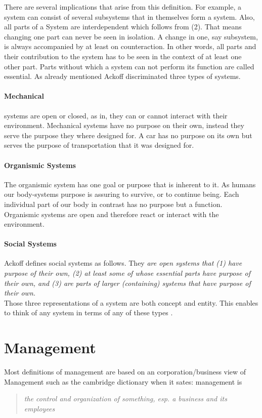 \documentclass{scrartcl}
\begin{document}
There are several implications that arise from this definition. For example, a system can consist of several subsystems that in themselves form a system. Also, all parts of a System are interdependent which follows from (2). That means changing one part can never be seen in isolation. A change in one, say subsystem, is always accompanied by at least on counteraction. In other words, all parts and their contribution to the system has to be seen in the context of at least one other part.
Parts without which a system can not perform its function are called essential.
As already mentioned Ackoff discriminated three types of systems.

\paragraph{Mechanical} systems are open or closed, as in, they can or cannot interact with their environment. Mechanical systems have no purpose on their own, instead they serve the purpose they where designed for. A car has no purpose on its own but serves the purpose of transportation that it was designed for.  


\paragraph{Organismic Systems}
The organismic system has one goal or purpose that is inherent to it. As humans our body-systems purpose is assuring to survive, or to continue being. Each individual part of our body in contrast has no purpose but a function. Organismic systems are open and therefore react or interact with the environment.



\paragraph{Social Systems}
Ackoff defines social systems as follows. They {\itshape{ \glqq are open systems that (1) have purpose of their own, (2) at least some of whose essential parts have purpose of their own, and (3) are parts of larger (containing) systems that have purpose of their own. \grqq}} \cite{ackoff1994systems} 
\\

Those three representations of a system are both concept and entity. This enables to think of any system in terms of any of these types \cite{ackoff1994systems}. 


\section{Management}
Most definitions of management are based on an corporation/business view of Management such as the cambridge dictionary when it sates: management is\\
\begin{quote}\itshape{ \glqq the control and organization of something, esp. a business and its employees \grqq
} \cite{ackoff1994systems}
\end{quote}
\end{document}
